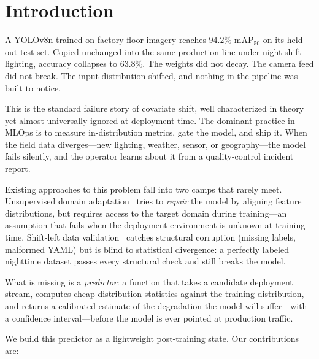 \documentclass[10pt,twocolumn,letterpaper]{article}
\begin{document}
\section{Introduction}
A YOLOv8n trained on factory-floor imagery reaches $94.2\%$ mAP$_{50}$ on its held-out test set. Copied unchanged into the same production line under night-shift lighting, accuracy collapses to $63.8\%$. The weights did not decay. The camera feed did not break. The input distribution shifted, and nothing in the pipeline was built to notice.

This is the standard failure story of covariate shift, well characterized in theory~\cite{bendavid2010theory} yet almost universally ignored at deployment time. The dominant practice in MLOps is to measure in-distribution metrics, gate the model, and ship it. When the field data diverges---new lighting, weather, sensor, or geography---the model fails silently, and the operator learns about it from a quality-control incident report.

Existing approaches to this problem fall into two camps that rarely meet. Unsupervised domain adaptation~\cite{xu2020domain,zhang2021domain} tries to \emph{repair} the model by aligning feature distributions, but requires access to the target domain during training---an assumption that fails when the deployment environment is unknown at training time. Shift-left data validation~\cite{ng2021data} catches structural corruption (missing labels, malformed YAML) but is blind to statistical divergence: a perfectly labeled nighttime dataset passes every structural check and still breaks the model.


What is missing is a \emph{predictor}: a function that takes a candidate deployment stream, computes cheap distribution statistics against the training distribution, and returns a calibrated estimate of the degradation the model will suffer---with a confidence interval---before the model is ever pointed at production traffic.

We build this predictor as a lightweight post-training state. Our contributions are:
\end{document}
